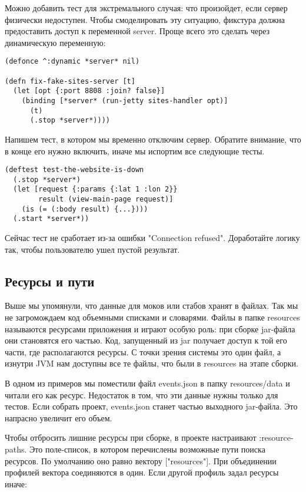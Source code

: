 Можно добавить тест для экстремального случая: что произойдет, если сервер
физически недоступен. Чтобы смоделировать эту ситуацию, фикстура должна
предоставить доступ к переменной server. Проще всего это сделать через
динамическую переменную:

\begin{verbatim}
(defonce ^:dynamic *server* nil)

(defn fix-fake-sites-server [t]
  (let [opt {:port 8808 :join? false}]
    (binding [*server* (run-jetty sites-handler opt)]
      (t)
      (.stop *server*))))
\end{verbatim}

Напишем тест, в котором мы временно отключим сервер. Обратите внимание, что в
конце его нужно включить, иначе мы испортим все следующие тесты.

\begin{verbatim}
(deftest test-the-website-is-down
  (.stop *server*)
  (let [request {:params {:lat 1 :lon 2}}
        result (view-main-page request)]
    (is (= (:body result) {...})))
  (.start *server*))
\end{verbatim}

Сейчас тест не сработает из-за ошибки "Connection refused". Доработайте логику
так, чтобы пользователю ушел пустой результат.

\subsection{Ресурсы и пути}

Выше мы упомянули, что данные для моков или стабов хранят в файлах. Так мы не
загромождаем код объемными списками и словарями. Файлы в папке resources
называются ресурсами приложения и играют особую роль: при сборке jar-файла они
становятся его частью. Код, запущенный из jar получает доступ к той его части,
где располагаются ресурсы. С точки зрения системы это один файл, а изнутри JVM
нам доступны все те файлы, что были в resources на этапе сборки.

В одном из примеров мы поместили файл events.json в папку resources/data и
читали его как ресурс. Недостаток в том, что эти данные нужны только для
тестов. Если собрать проект, events.json станет частью выходного jar-файла. Это
напрасно увеличит его объем.

Чтобы отбросить лишние ресурсы при сборке, в проекте настраивают
:resource-paths. Это поле-список, в котором перечислены возможные пути поиска
ресурсов. По умолчанию оно равно вектору ["resources"]. При объединении профилей
вектора соединяются в один. Если другой профиль задал ресурсы иначе:

